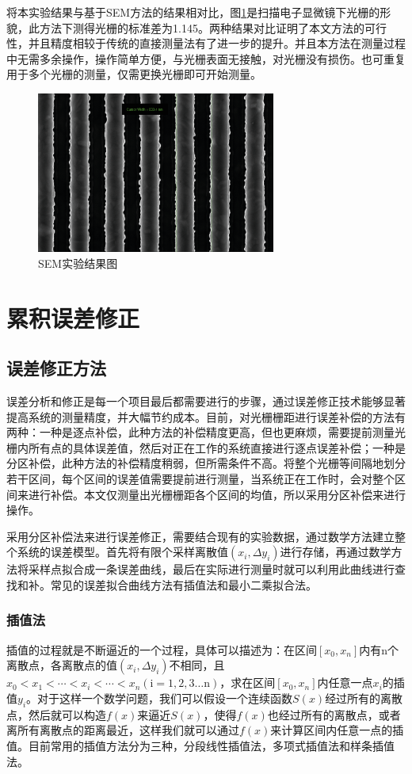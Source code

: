 \documentclass[type=master,oneside]{fduthesis}
\begin{document}
将本实验结果与基于SEM方法的结果相对比，图\ref{fig:SEM实验结果图}是扫描电子显微镜下光栅的形貌，此方法下测得光栅的标准差为1.145。两种结果对比证明了本文方法的可行性，并且精度相较于传统的直接测量法有了进一步的提升。并且本方法在测量过程中无需多余操作，操作简单方便，与光栅表面无接触，对光栅没有损伤。也可重复用于多个光栅的测量，仅需更换光栅即可开始测量。

\begin{figure}[H]
  \centering
  \includegraphics[width=0.7\textwidth]{5-fig/SEM.eps}
  \caption{SEM实验结果图}
  \label{fig:SEM实验结果图}
\end{figure}

\section{累积误差修正}
\subsection{误差修正方法}
误差分析和修正是每一个项目最后都需要进行的步骤，通过误差修正技术能够显著提高系统的测量精度，并大幅节约成本。目前，对光栅栅距进行误差补偿的方法有两种：一种是逐点补偿，此种方法的补偿精度更高，但也更麻烦，需要提前测量光栅内所有点的具体误差值，然后对正在工作的系统直接进行逐点误差补偿；一种是分区补偿，此种方法的补偿精度稍弱，但所需条件不高。将整个光栅等间隔地划分若干区间，每个区间的误差值需要提前进行测量，当系统正在工作时，会对整个区间来进行补偿。本文仅测量出光栅栅距各个区间的均值，所以采用分区补偿来进行操作。

采用分区补偿法来进行误差修正，需要结合现有的实验数据，通过数学方法建立整个系统的误差模型。首先将有限个采样离散值$(x_{i},\Delta y_{i})$进行存储，再通过数学方法将采样点拟合成一条误差曲线，最后在实际进行测量时就可以利用此曲线进行查找和补。常见的误差拟合曲线方法有插值法和最小二乘拟合法。

\subsubsection{插值法}
插值的过程就是不断逼近的一个过程，具体可以描述为：在区间$[x_0,x_n]$内有n个离散点，各离散点的值$(x_{i},\Delta y_{i})$不相同，且$x_0<x_1<\cdots<x_i<\cdots<x_n (\mathrm{i}=1,2,3 \ldots \mathrm{n})$，求在区间$[x_0,x_n]$内任意一点$x_{i}$的插值$y_{i}$。对于这样一个数学问题，我们可以假设一个连续函数$S(x)$经过所有的离散点，然后就可以构造$f(x)$来逼近$S(x)$，使得$f(x)$也经过所有的离散点，或者离所有离散点的距离最近，这样我们就可以通过$f(x)$来计算区间内任意一点的插值。目前常用的插值方法分为三种，分段线性插值法，多项式插值法和样条插值法。
\end{document}
